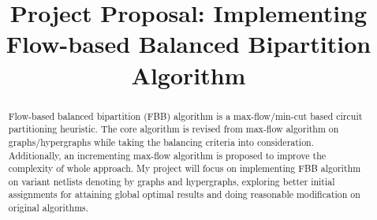 \documentclass[conference,10pt]{IEEEtran}
\begin{document}

\title{Project Proposal: Implementing Flow-based Balanced Bipartition Algorithm}

\author{
}

%
 
\maketitle

\newcommand{\Fq}{{\mathbb{F}}_{q}}
\newcommand{\Fkk}{{\mathbb{F}}_{2^k}}
\newcommand{\Fkkx}[1][x]{\ensuremath{\mathbb{F}}_{2^k}[#1]\xspace}
\newcommand{\Grobner}{Gr\"{o}bner\xspace}
\newcommand{\B}{{\mathbb{B}}}
\newcommand{\Z}{{\mathbb{Z}}}
\newcommand{\F}{{\mathcal{F}}}
\newcommand{\G}{{\mathcal{G}}}
\newcommand{\R}{\mathbb{R}}

\newcommand{\HMetis}{{\scriptsize{H}}M{\scriptsize{E}}T{\scriptsize{I}}S}

\newcommand{\debug}[1]{\textcolor{gray}{[ #1 ]}}



\begin{abstract}
Flow-based balanced bipartition (FBB) algorithm is a max-flow/min-cut based circuit partitioning
heuristic. The core algorithm is revised from max-flow algorithm on graphs/hypergraphs while taking
the balancing criteria into consideration. Additionally, an incrementing max-flow algorithm
is proposed to improve the complexity of whole approach. My project will focus on implementing
FBB algorithm on variant netlists denoting by graphs and hypergraphs, exploring better initial
assignments for attaining global optimal results and doing reasonable modification on original
algorithms.
\end{abstract}
\end{document}
